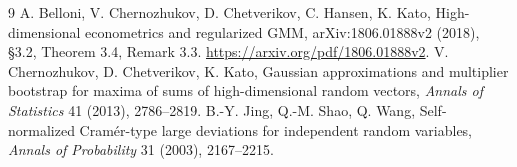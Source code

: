 \documentclass[11pt]{article}
\theoremstyle{definition}
\begin{document}
\begin{thebibliography}{9}
 A. Belloni, V. Chernozhukov, D. Chetverikov, C. Hansen, K. Kato, High-dimensional econometrics and
regularized GMM, arXiv:1806.01888v2 (2018), \S3.2, Theorem 3.4, Remark 3.3. \url{https://arxiv.org/pdf/1806.01888v2}.
 V. Chernozhukov, D. Chetverikov, K. Kato, Gaussian approximations and multiplier bootstrap for maxima of sums
of high-dimensional random vectors, \emph{Annals of Statistics} 41 (2013), 2786--2819.
 B.-Y. Jing, Q.-M. Shao, Q. Wang, Self-normalized Cram\'er-type large deviations for independent random
variables, \emph{Annals of Probability} 31 (2003), 2167--2215.
\end{thebibliography}
\end{document}
